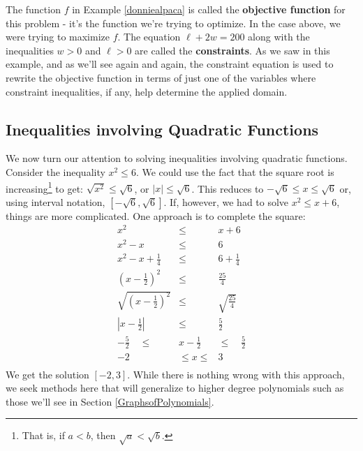 \documentclass{ximera}
\begin{document}
The function $f$ in Example \ref{donniealpaca} is called the \textbf{objective function} for this problem - it's the function we're trying to optimize.  In the case above, we were trying to maximize $f$. The equation  $\ell+2w = 200$ along with the inequalities $w>0$ and $\ell >0$ are called the \textbf{constraints}.   As we saw in this example, and as we'll see again and again, the constraint equation is used to rewrite the objective function in terms of just one of the variables where constraint inequalities, if any, help determine the applied domain.

\subsection{Inequalities involving Quadratic Functions}
\label{QuadraticInequalities}


We now turn our attention to solving inequalities involving quadratic functions.   Consider the inequality $x^2 \leq 6$.  We could use the fact that the square root is increasing\footnote{That is, if $a < b$, then $\sqrt{a} < \sqrt{b}$.} to get: $\sqrt{x^2} \leq \sqrt{6}$, or $|x| \leq \sqrt{6}$.  This reduces to $-\sqrt{6} \leq x \leq \sqrt{6}$ or, using interval notation, $[-\sqrt{6}, \sqrt{6}]$. If, however, we had to solve $x^2 \leq x+6$, things are more complicated.  One approach is to complete the square: \[ \begin{array}{rcl}

x^2 & \leq & x+6 \\
x^2 - x & \leq & 6 \\
x^2 - x + \frac{1}{4} & \leq &  6 + \frac{1}{4} \\   

\left(x - \frac{1}{2} \right)^2 & \leq & \frac{25}{4} \\   

\sqrt{\left(x - \frac{1}{2} \right)^2} & \leq & \sqrt{\frac{25}{4}} \\   

\left| x - \frac{1}{2} \right| & \leq & \frac{5}{2} \\ 

-\frac{5}{2} \quad \leq & x - \frac{1}{2} & \leq \quad \frac{5}{2} \\ 

-2 \quad &  \leq  x  \leq & 3 \\  \end{array} \] We get the solution $[-2,3]$.  While there is nothing wrong with this approach, we seek methods here that will generalize to higher degree polynomials such as those we'll see in Section \ref{GraphsofPolynomials}.  
\end{document}
